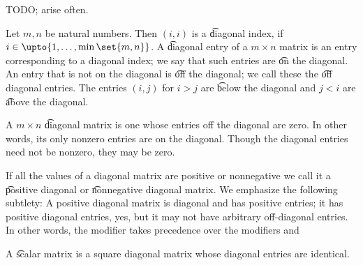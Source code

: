 
\sbasic






























\sstart
{}



TODO;
arise often.


Let $m, n$ be natural numbers.
Then $(i, i)$ is a \t{diagonal index}, if $i \in \upto{1, \dots, \min\set{m, n}}$.
A \t{diagonal entry} of a $m \times n$ matrix is an entry corresponding to a diagonal index; we say that such entries are \t{on the diagonal}.
An entry that is not on the diagonal is \t{off the diagonal}; we call these the \t{off diagonal entries}.
The entries $(i, j)$ for $i > j$ are \t{below the diagonal} and $j < i$ are \t{above the diagonal}.

A $m \times n$ \t{diagonal} matrix is one whose entries off the diagonal are zero.
In other words, its only nonzero entries are on the diagonal.
Though the diagonal entries need not be nonzero, they may be zero.

If all the values of a diagonal matrix are positive or nonnegative we call it a \t{positive diagonal} or \t{nonnegative diagonal} matrix.
We emphasize the following subtlety: A positive diagonal matrix is diagonal and has positive entries; it has positive diagonal entries, yes, but it may not have arbitrary off-diagonal entries.
In other words, the modifier  takes precedence over the modifiers  and 

A \t{scalar} matrix is a square diagonal matrix whose diagonal entries are identical.
\strats
